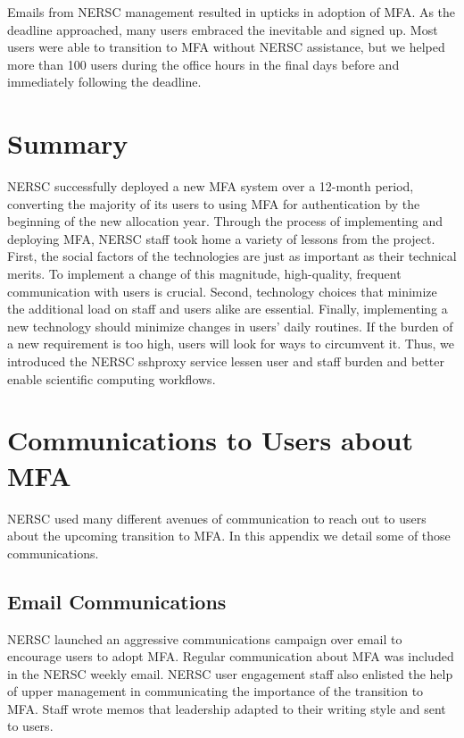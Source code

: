 \documentclass[sigconf,review]{acmart}
\begin{document}
Emails from NERSC management resulted in upticks in adoption of MFA. As the
deadline approached, many users embraced the inevitable and signed up. Most
users were able to transition to MFA without NERSC assistance, but we helped
more than 100 users during the office hours in the final days before and
immediately following the deadline.

\section{Summary}
\label{summary}

NERSC successfully deployed a new MFA system over a 12-month period, converting
the majority of its users to using MFA for authentication by the beginning of
the new allocation year. Through the process of implementing and deploying MFA,
NERSC staff took home a variety of lessons from the project. First, the social
factors of the technologies are just as important as their technical merits. To
implement a change of this magnitude, high-quality, frequent communication with
users is crucial. Second, technology choices that minimize the additional load
on staff and users alike are essential. Finally, implementing a new technology
should minimize changes in users' daily routines. If the burden of a new
requirement is too high, users will look for ways to circumvent it. Thus, we
introduced the NERSC sshproxy service lessen user and staff burden and better
enable scientific computing workflows.




\appendix

\section{Communications to Users about MFA}
NERSC used many different avenues of communication to reach out to users about the upcoming transition to MFA. In this 
appendix we detail some of those communications.

\subsection{Email Communications}

NERSC launched an aggressive communications campaign over email to encourage users to adopt MFA. Regular communication about MFA was included in the NERSC weekly email.
NERSC user engagement staff also enlisted the help of upper management in communicating the importance of the transition to MFA. Staff wrote memos that leadership adapted to their writing style and sent to users.
\end{document}
